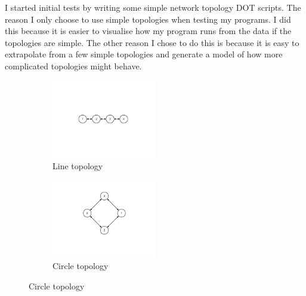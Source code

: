 \documentclass[12pt]{article}
\begin{document}
I started initial tests by writing some simple network topology DOT
scripts. The reason I only choose to use simple topologies
when testing my programs. I did this because it is easier to
visualise how my program runs from the data if the topologies
are simple. The other reason I chose to do this is because
it is easy to extrapolate from a few simple topologies and
generate a model of how more complicated topologies might
behave.
\begin{figure}[htp]
    \begin{subfigure}[b]{0.5\textwidth}
        \centering
        \includegraphics[clip,trim=45mm 60mm 45mm 60mm,width=0.5\textwidth]{images/line-topo.pdf}
        \caption{Line topology}
        \label{fig:line_topology}
    \end{subfigure}
    \begin{subfigure}[b]{0.5\textwidth}
        \centering
        \includegraphics[clip,trim=45mm 40mm 45mm 20mm,width=0.5\textwidth]{images/circle-topo.pdf}
        \caption{Circle topology}
        \label{fig:circle_topology}
    \end{subfigure}


\end{figure}
\end{document}
